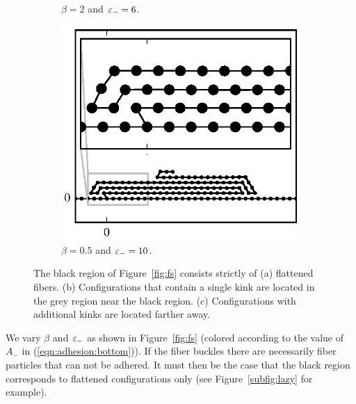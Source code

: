 {\begin{figure}[h!]
\begin{subfigure}{.5\textwidth}
			\caption{$\beta=2$ and $\varepsilon_-=6$.\label{subfig:lazy_loop}}
		\end{subfigure}

		\begin{subfigure}{.5\textwidth}
			\centering
			\includegraphics{./fig/ch3/fs/b0.5_eb10.eps}
			\caption{$\beta=0.5$ and $\varepsilon_-=10$.\label{subfig:lazy_many_loops}}
		\end{subfigure}		
		\caption{The black region of Figure~\ref{fig:fs} consists strictly of (a) flattened fibers. (b) Configurations that contain a single kink are located in the grey region near the black region. (c) Configurations with additional kinks are located farther away.\label{fig:lazy}}	
	\end{figure}

We vary $\beta$ and $\varepsilon_-$ as shown in Figure~\ref{fig:fs} (colored according to the value of $A_-$ in (\ref{eqn:adhesion:bottom})). If the fiber buckles there are necessarily fiber particles that can not be adhered. It must then be the case that the black region corresponds to flattened configurations only (see Figure~\ref{subfig:lazy} for example). 

}
